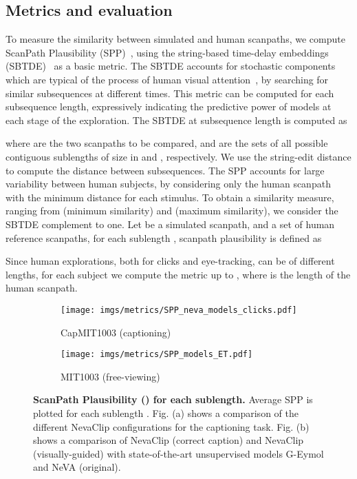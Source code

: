 \documentclass{article}
\begin{document}
\subsection{Metrics and evaluation}
To measure the similarity between simulated and human scanpaths, we compute ScanPath Plausibility (SPP)~\cite{fahimi2021metrics}, using the string-based time-delay embeddings (SBTDE)~\cite{schwinn2022behind} as a basic metric. The SBTDE accounts for stochastic components which are typical of the process of human visual attention~\cite{pang2010stochastic}, by searching for similar subsequences at different times. This metric can be computed for each subsequence length, expressively indicating the predictive power of models at each stage of the exploration. The SBTDE at subsequence length  is computed as 



where  are the two scanpaths to be compared, and  are the sets of all possible contiguous sublengths of size  in  and , respectively. We use the string-edit distance to compute the distance  between subsequences.
The SPP accounts for large variability between human subjects, by considering only the human scanpath with the minimum distance for each stimulus. To obtain a similarity measure, ranging from  (minimum similarity) and  (maximum similarity), we consider the SBTDE complement to one. Let  be a simulated scanpath, and  a set of human reference scanpaths, for each sublength , scanpath plausibility is defined as 

Since human explorations, both for clicks and eye-tracking, can be of different lengths, for each subject we compute the metric up to , where  is the length of the human scanpath.

\begin{figure}[t]
    \centering
    \begin{subfigure}{0.49\textwidth}
        \texttt{[image: imgs/metrics/SPP\_neva\_models\_clicks.pdf]}
        \caption{CapMIT1003 (captioning)}
        \label{fig:clicks}
    \end{subfigure}
    \hfill
    \begin{subfigure}{0.49\textwidth}
        \texttt{[image: imgs/metrics/SPP\_models\_ET.pdf]}
        \caption{MIT1003 (free-viewing)}\label{fig:et}
    \end{subfigure}
    \caption{\textbf{ScanPath Plausibility () for each sublength. }Average SPP is plotted for each sublength . Fig. (a) shows a comparison of the different NevaClip configurations for the captioning task. Fig. (b) shows a comparison of NevaClip (correct caption) and NevaClip (visually-guided) with state-of-the-art unsupervised models G-Eymol and NeVA (original). }
    \label{fig:metrics}
\end{figure}
\end{document}
